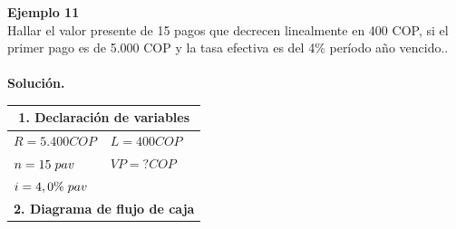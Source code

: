 \textbf{Ejemplo 11}\\
Hallar el valor presente de 15 pagos que decrecen
linealmente en 400 COP, si el primer pago es de 5.000 COP y la tasa efectiva es del 4\% período año
vencido..\\ \\
\textbf{Solución.}\\
\begin{center}
 \renewcommand{\arraystretch}{1.5}%
 \begin{longtable}[H]{|p{0.5\linewidth}|p{0.5\linewidth}|}
  \hline
  \multicolumn{2}{|c|}{\cellcolor[HTML]{FFB183}\textbf{1. Declaración de variables}}                                                                                                                 \\ \hline
  $R =  5.400 COP$                                                                                & $L = 400 COP$                                                                                   \\
  $n=15 \hspace{1mm} pav$                                                                         & $VP=? COP$                                                                                         \\
  $i=4,0\% \hspace{1mm} pav$                                                                      &                                                                                                  \\
  \multicolumn{2}{|c|}{\cellcolor[HTML]{FFB183}\textbf{2. Diagrama de flujo de caja}}                                                                                                                \\ \hline

\end{longtable}
\end{center}

